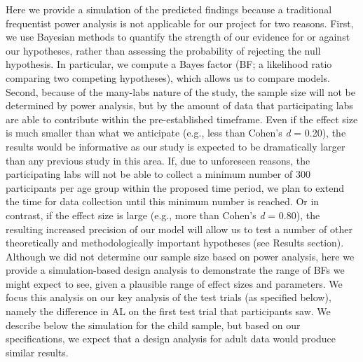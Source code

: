 \documentclass[
  english,
  man,floatsintext]{apa6}
\begin{document}
Here we provide a simulation of the predicted findings because a traditional frequentist power analysis is not applicable for our project for two reasons. First, we use Bayesian methods to quantify the strength of our evidence for or against our hypotheses, rather than assessing the probability of rejecting the null hypothesis. In particular, we compute a Bayes factor (BF; a likelihood ratio comparing two competing hypotheses), which allows us to compare models. Second, because of the many-labs nature of the study, the sample size will not be determined by power analysis, but by the amount of data that participating labs are able to contribute within the pre-established timeframe. Even if the effect size is much smaller than what we anticipate (e.g., less than Cohen's \emph{d} = 0.20), the results would be informative as our study is expected to be dramatically larger than any previous study in this area. If, due to unforeseen reasons, the participating labs will not be able to collect a minimum number of 300 participants per age group within the proposed time period, we plan to extend the time for data collection until this minimum number is reached. Or in contrast, if the effect size is large (e.g., more than Cohen's \emph{d} = 0.80), the resulting increased precision of our model will allow us to test a number of other theoretically and methodologically important hypotheses (see Results section).
Although we did not determine our sample size based on power analysis, here we provide a simulation-based design analysis to demonstrate the range of BFs we might expect to see, given a plausible range of effect sizes and parameters. We focus this analysis on our key analysis of the test trials (as specified below), namely the difference in AL on the first test trial that participants saw. We describe below the simulation for the child sample, but based on our specifications, we expect that a design analysis for adult data would produce similar results.
\end{document}
